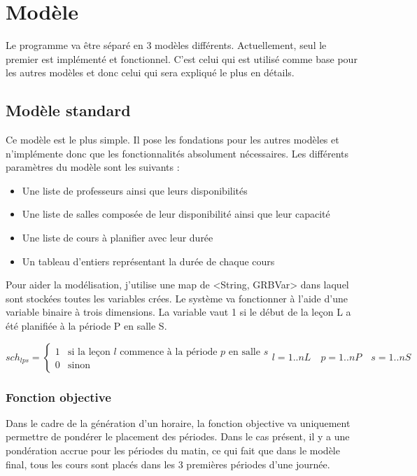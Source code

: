 \section{Modèle}
Le programme va être séparé en 3 modèles différents. Actuellement, seul le premier est implémenté et fonctionnel. C'est celui qui est utilisé comme base pour les autres modèles et donc celui qui sera expliqué le plus en détails.

\subsection{Modèle standard}
Ce modèle est le plus simple. Il pose les fondations pour les autres modèles et n'implémente donc que les fonctionnalités absolument nécessaires. Les différents paramètres du modèle sont les suivants :
\begin{itemize}
\item Une liste de professeurs ainsi que leurs disponibilités
\item Une liste de salles composée de leur disponibilité ainsi que leur capacité
\item Une liste de cours à planifier avec leur durée
\item Un tableau d'entiers représentant la durée de chaque cours
\end{itemize}

Pour aider la modélisation, j'utilise une map de <String, GRBVar> dans laquel sont stockées toutes les variables crées. Le système va fonctionner à l'aide d'une variable binaire à trois dimensions. La variable vaut 1 si le début de la leçon L a été planifiée à la période P en salle S.

\begin{equation*}
sch_{lps} =
\begin{cases}
1 & \text{si la leçon $l$ commence à la période $p$ en salle $s$} \\
0 & \text{sinon}
\end{cases}
l = 1 .. nL \quad p = 1 .. nP \quad s = 1 .. nS
\end{equation*}

\subsubsection{Fonction objective}
Dans le cadre de la génération d'un horaire, la fonction objective va uniquement permettre de pondérer le placement des périodes. Dans le cas présent, il y a une pondération accrue pour les périodes du matin, ce qui fait que dans le modèle final, tous les cours sont placés dans les 3 premières périodes d'une journée.

